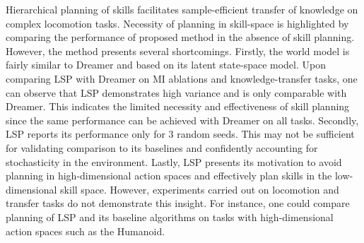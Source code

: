 \documentclass[11pt,letterpaper]{article}
\begin{document}
Hierarchical planning of skills facilitates sample-efficient transfer of knowledge on complex locomotion tasks. Necessity of planning in skill-space is highlighted by comparing the performance of proposed method in the absence of skill planning. However, the method presents several shortcomings. Firstly, the world model is fairly similar to Dreamer and based on its latent state-space model. Upon comparing LSP with Dreamer on MI ablations and knowledge-transfer tasks, one can observe that LSP demonstrates high variance and is only comparable with Dreamer. This indicates the limited necessity and effectiveness of skill planning since the same performance can be achieved with Dreamer on all tasks. Secondly, LSP reports its performance only for 3 random seeds. This may not be sufficient for validating comparison to its baselines and confidently accounting for stochasticity in the environment. Lastly, LSP presents its motivation to avoid planning in high-dimensional action spaces and effectively plan skills in the low-dimensional skill space. However, experiments carried out on locomotion and transfer tasks do not demonstrate this insight. For instance, one could compare planning of LSP and its baseline algorithms on tasks with high-dimensional action spaces such as the Humanoid. 
\end{document}
